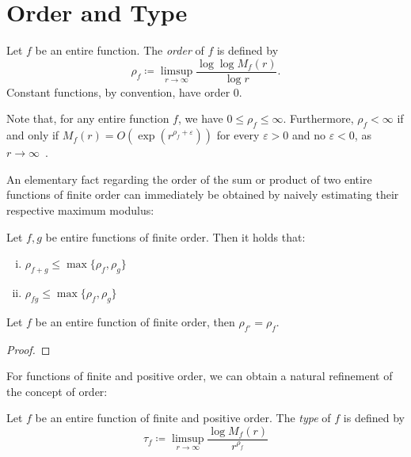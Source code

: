 \section{Order and Type}
\label{sec:order-type}

\begin{definition} \label{def:order}
    Let $f$ be an entire function. The \emph{order} of $f$ is defined by
    \begin{equation} \label{eq:def-order}
        \rho_f \coloneqq \limsup_{r \to \infty} \frac{\log \log M_f(r)}{\log r}.
    \end{equation}
    Constant functions, by convention, have order 0.
\end{definition}

Note that, for any entire function $f$, we have $0 \leq \rho_f \leq \infty$. Furthermore, $\rho_f < \infty$ if and only if $M_f(r) = O(\exp(r^{\rho_f + \varepsilon}))$ for every $\varepsilon > 0$ and no $\varepsilon < 0$, as $r \to \infty$~\cite{segal-complex-analysis}.

An elementary fact regarding the order of the sum or product of two entire functions of finite order can immediately be obtained by naively estimating their respective maximum modulus:

\begin{proposition} \label{prop:algebraic-properties-order}
    Let $f, g$ be entire functions of finite order. Then it holds that:
    \begin{enumerate}[i.]
        \item $\rho_{f + g} \leq \max \{ \rho_f, \rho_g \}$
        \item $\rho_{f g} \leq \max \{ \rho_f, \rho_g \}$
    \end{enumerate}
\end{proposition}

\begin{proposition} \label{prop:order-derivative}
    Let $f$ be an entire function of finite order, then $\rho_{f'} = \rho_f$.
\end{proposition}

\begin{proof}
\end{proof}

For functions of finite and positive order, we can obtain a natural refinement of the concept of order:

\begin{definition}
    Let $f$ be an entire function of finite and positive order. The \emph{type} of $f$ is defined by
    \begin{equation} \label{eq:def-type}
        \tau_f \coloneqq \limsup_{r \to \infty} \frac{\log M_f(r)}{r^{\rho_f}}
    \end{equation}
\end{definition}

